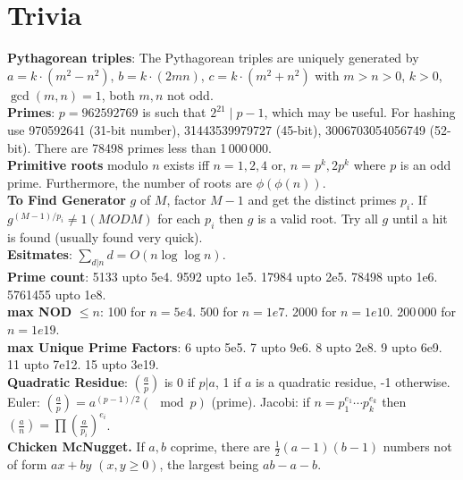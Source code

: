 \section{Trivia}
\textbf{Pythagorean triples}: The Pythagorean triples are uniquely generated by $a=k\cdot (m^{2}-n^{2})$, $b=k\cdot (2mn)$, $c=k\cdot (m^{2}+n^{2})$ with $m > n > 0$, $k > 0$, $\gcd(m,n) = 1$, both $m, n$ not odd.\\
\textbf{Primes}: $p=962592769$ is such that $2^{21} \mid p-1$, which may be useful. For hashing use 970592641 (31-bit number), 31443539979727 (45-bit), 3006703054056749 (52-bit). There are 78498 primes less than 1\,000\,000.\\
\textbf{Primitive roots} modulo $n$ exists iff $n = 1, 2, 4$ or, $n = p^k, 2p^k$ where $p$ is an odd prime. Furthermore, the number of roots are $\phi (\phi (n))$.\\
\textbf{To Find Generator} $g$ of $M$, factor $M - 1$ and get the distinct primes $p_i$. If $g^{(M - 1) / p_i } \neq 1 (MOD M)$ for each $p_i$ then $g$ is a valid root. Try all $g$ until a hit is found (usually found very quick).\\
\textbf{Esitmates}: $\sum_{d|n} d = O(n \log \log n)$.\\
\textbf{Prime count}: 5133 upto 5e4. 9592 upto 1e5. 17984 upto 2e5. 78498 upto 1e6. 5761455 upto 1e8.\\
\textbf{max NOD} $\leq n$: 100 for $n = 5e4$. 500 for $n = 1e7$. 2000 for $n = 1e10$. 200\,000 for $n = 1e19$.\\
\textbf{max Unique Prime Factors}: 6 upto 5e5. 7 upto 9e6. 8 upto 2e8. 9 upto 6e9. 11 upto 7e12. 15 upto 3e19.\\
\textbf{Quadratic Residue}: $(\frac{a}{p})$ is 0 if $p | a$, 1 if $a$ is a quadratic residue, -1 otherwise. Euler: $(\frac{a}{p}) = a^{(p - 1) / 2} (\mod p)$ (prime). Jacobi: if $n = p_1^{e_1}\cdots p_k^{e_k}$ then $(\frac{a}{n}) = \prod (\frac{a}{p_i})^{e_i}$.\\
\textbf{Chicken McNugget.} If $a, b$ coprime, there are $\frac{1}{2}(a - 1)(b - 1)$ numbers not of form $ax + by$ $(x, y \geq 0)$, the largest being $ab - a - b$.
